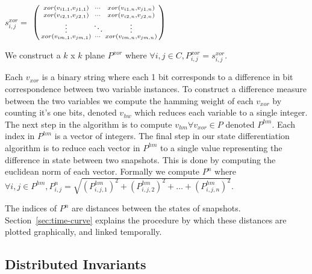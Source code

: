 

$s^{xor}_{i,j} = $
$\begin{psmallmatrix}
    xor(v_{i1,1},v_{j1,1}) & \cdots & xor(v_{i1,n},v_{j1,n}) \\
    xor(v_{i2,1},v_{j2,1})  & \cdots & xor(v_{i2,n},v_{j2,n}) \\
    \vdots  & \ddots & \vdots  \\
    xor(v_{im,1},v_{jm,1}) & \cdots & xor(v_{im,n},v_{jm,n}) \\
 \end{psmallmatrix}$

We construct a $k$ x $k$ plane $P^{xor}$ where $\forall i,j \in C, P^{xor}_{i,j} =
s^{xor}_{i,j}$.

Each $v_{xor}$ is a binary string where each 1 bit corresponds to a difference
in bit correspondence between two variable instances. To construct a difference
measure between the two variables we compute the hamming weight of each
$v_{xor}$ by counting it's one bits, denoted $v_{hw}$ which reduces each
variable to a single integer. The next step in the algorithm is to compute
$v_{hm} \forall v_{xor} \in P$ denoted $P^{hm}$. Each index in $P^{hm}$ is a
vector of integers. The final step in our state differentiation algorithm is to
reduce each vector in $P^{hm}$ to a single value representing the difference in
state between two snapshots. This is done by computing the euclidean norm of
each vector. Formally we compute $P^n$ where $\forall i,j \in P^{hm}, P^n_{i,j}
= \sqrt{(P^{hm}_{i,j,1})^2 + (P^{hm}_{i,j,2})^2 +\dots + (P^{hm}_{i,j,n})^2 }$.

The indices of $P^n$ are distances between the states of snapshots.
Section~\ref{sec:time-curve} explains the procedure by which these distances are
plotted graphically, and linked temporally.

\subsection{Distributed Invariants}

